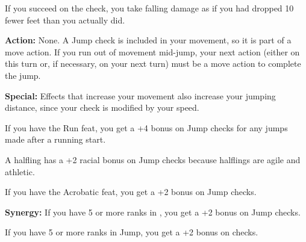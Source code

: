 If you succeed on the check, you take falling damage as if you had dropped 10 fewer feet than you actually did.

\textbf{Action:} None. A Jump check is included in your movement, so it is part of a move action. If you run out of movement mid-jump, your next action (either on this turn or, if necessary, on your next turn) must be a move action to complete the jump.

\textbf{Special:} Effects that increase your movement also increase your jumping distance, since your check is modified by your speed.

If you have the Run feat, you get a +4 bonus on Jump checks for any jumps made after a running start.

A halfling has a +2 racial bonus on Jump checks because halflings are agile and athletic.

If you have the Acrobatic feat, you get a +2 bonus on Jump checks.

\textbf{Synergy:} If you have 5 or more ranks in , you get a +2 bonus on Jump checks.

If you have 5 or more ranks in Jump, you get a +2 bonus on  checks.
